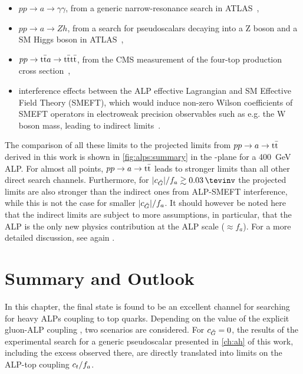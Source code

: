 \begin{itemize}
    \item $p p \rightarrow a \rightarrow \gamma \gamma$, from a generic narrow-resonance search in ATLAS~\cite{ATLAS:2021uiz},

    \item $p p \rightarrow a \rightarrow Z h$, from a search for pseudoscalars decaying into a Z boson and a SM Higgs boson in ATLAS~\cite{ATLAS:2022enb},

    \item $p p \rightarrow \mathrm{t \bar{t}} a \rightarrow \mathrm{t \bar{t}} \mathrm{t \bar{t}}$, from the CMS measurement of the four-top production cross section~\cite{CMS:2023ftu},

    \item interference effects between the ALP effective Lagrangian and SM Effective Field Theory (SMEFT), which would induce non-zero Wilson coefficients of SMEFT operators in electroweak precision observables such as e.g. the W boson mass, leading to indirect limits~\cite{Biekotter:2023mpd}.
\end{itemize}

The comparison of all these limits to the projected limits from $pp \rightarrow a \rightarrow \mathrm{t \bar{t}}$ derived in this work is shown in \cref{fig:alps:summary} in the \ct-\cG plane for a \SI{400}{\GeV} ALP. For almost all points, $pp \rightarrow a \rightarrow \mathrm{t \bar{t}}$ leads to stronger limits than all other direct search channels. Furthermore, for $|\cG|/f_a \gtrsim \SI{0.03}{\tevinv}$ the projected limits are also stronger than the indirect ones from ALP-SMEFT interference, while this is not the case for smaller $|c_{\tilde{G}}|/f_a$. It should however be noted here that the indirect limits are subject to more assumptions, in particular, that the ALP is the only new physics contribution at the ALP scale ($\approx f_a$). For a more detailed discussion, see again .

\section{Summary and Outlook}
\label{sec:alps:summary}

In this chapter, the \ttbar final state is found to be an excellent channel for searching for heavy ALPs coupling to top quarks. Depending on the value of the explicit gluon-ALP coupling \cG, two scenarios are considered. For $c_{\tilde{G}} = 0$, the results of the experimental search for a generic pseudoscalar presented in \cref{ch:ah} of this work, including the excess observed there,  are directly translated into limits on the ALP-top coupling $c_t/f_a$. 

